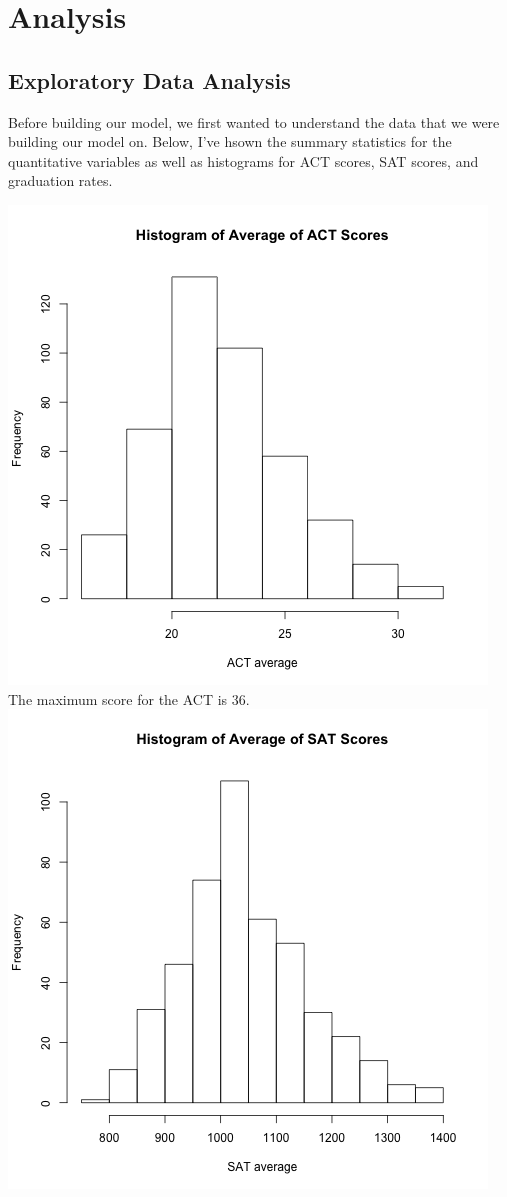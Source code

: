 \documentclass{article}
\begin{document}




\section{Analysis}

\subsection{Exploratory Data Analysis}
Before building our model, we first wanted to understand the data that we were building our model on. Below, I've hsown the summary statistics for the quantitative variables as well as histograms for ACT scores, SAT scores, and graduation rates. 


\includegraphics{../../images/histogram_ACT_avg.png}
The maximum score for the ACT is 36.
\includegraphics{../../images/histogram_SAT_avg.png}
\end{document}
